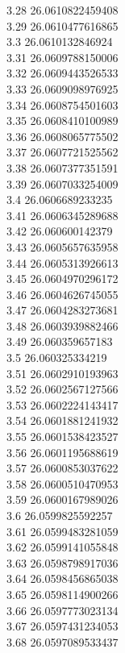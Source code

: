 {3.28	26.0610822459408\\
3.29	26.0610477616865\\
3.3	26.0610132846924\\
3.31	26.0609788150006\\
3.32	26.0609443526533\\
3.33	26.0609098976925\\
3.34	26.0608754501603\\
3.35	26.0608410100989\\
3.36	26.0608065775502\\
3.37	26.0607721525562\\
3.38	26.0607377351591\\
3.39	26.0607033254009\\
3.4	26.0606689233235\\
3.41	26.0606345289688\\
3.42	26.060600142379\\
3.43	26.0605657635958\\
3.44	26.0605313926613\\
3.45	26.0604970296172\\
3.46	26.0604626745055\\
3.47	26.0604283273681\\
3.48	26.0603939882466\\
3.49	26.060359657183\\
3.5	26.060325334219\\
3.51	26.0602910193963\\
3.52	26.0602567127566\\
3.53	26.0602224143417\\
3.54	26.0601881241932\\
3.55	26.0601538423527\\
3.56	26.0601195688619\\
3.57	26.0600853037622\\
3.58	26.0600510470953\\
3.59	26.0600167989026\\
3.6	26.0599825592257\\
3.61	26.0599483281059\\
3.62	26.0599141055848\\
3.63	26.0598798917036\\
3.64	26.0598456865038\\
3.65	26.0598114900266\\
3.66	26.0597773023134\\
3.67	26.0597431234053\\
3.68	26.0597089533437\\
}
